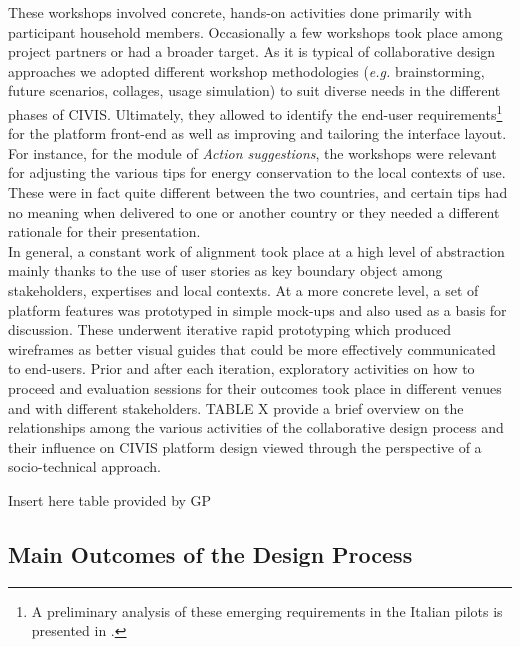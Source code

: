 These workshops involved concrete, hands-on activities done primarily with participant household members.
Occasionally a few workshops took place among project partners or had a broader target.
As it is typical of collaborative design approaches we adopted different workshop methodologies (\textit{e.g.} brainstorming, future scenarios,
collages, usage simulation) to suit diverse needs in the different phases of CIVIS.
Ultimately, they allowed to identify the end-user requirements\footnote{A preliminary analysis of these emerging requirements in the Italian pilots
is presented in \cite{capaccioli_participatory_2016}.} for the platform front-end as well as
improving and tailoring the interface layout.
% 
For instance, for the module of \textit{Action suggestions}, the workshops were relevant for adjusting the various
tips for energy conservation to the local contexts of use. These were in fact quite different between the two countries,
 and certain tips had no meaning when delivered to one or another country or they needed a different
 rationale for their presentation.\\
 
In general, a constant work of alignment took place at a high level of abstraction mainly thanks to
the use of user stories as key boundary object among stakeholders,
expertises and local contexts.
At a more concrete level, a set of platform features was prototyped in simple mock-ups
and also used as a basis for discussion. These underwent iterative rapid prototyping which
produced wireframes as better visual guides that could be more effectively communicated to end-users.
Prior and after each iteration, exploratory activities on how to proceed and evaluation sessions for their outcomes took place in different venues and with different stakeholders.
TABLE X provide a brief overview on the relationships among the various activities of the collaborative design process and their influence on CIVIS platform design viewed through the perspective of a socio-technical approach. 

\begin{svgraybox}
Insert here table provided by GP
\end{svgraybox}

\subsection{Main Outcomes of the Design Process} %

